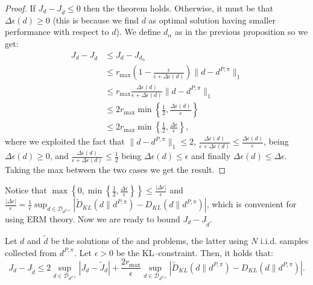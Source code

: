 \begin{proof}
	If $J_d - J_{\overline{d}} \le 0$ then the theorem holds. Otherwise, it must be that $\Delta \epsilon(d) \ge 0$ (this is because we find $\overline{d}$ as optimal solution having smaller performance with respect to $d$). We define $d_{\alpha}$ as in the previous proposition so we get:
	\begin{align*}
		J_{d} - J_{\overline{d}} & \le J_{d} - J_{d_{\alpha}}  \\
			& \le r_{\max}  \left(1 - \frac{\epsilon}{\epsilon + \Delta \epsilon(d)} \right) \|d - d^{P,\pi} \|_1  \\
			& \le r_{\max} \frac{\Delta \epsilon(d)}{\epsilon + \Delta \epsilon(d)}  \|d -  d^{P,\pi}\|_1  \\
			& \le 2 r_{\max} \min \left\{ \frac{1}{2}, \frac{\Delta \epsilon(d)}{\epsilon} \right\}  \\
			& \le 2 r_{\max}  \min \left\{ \frac{1}{2}, \frac{\Delta \epsilon}{\epsilon} \right\},
	\end{align*}
	where we exploited the fact that $\|d - d^{P,\pi} \|_1 \le 2$,  $\frac{\Delta \epsilon(d)}{\epsilon + \Delta \epsilon(d)} \le  \frac{\Delta \epsilon(d)}{\epsilon}$, being $\Delta \epsilon(d) \ge 0$, and $\frac{\Delta \epsilon(d)}{\epsilon + \Delta \epsilon(d)} \le  \frac{1}{2}$ being $\Delta\epsilon(d) \leq \epsilon$ and finally $\Delta \epsilon(d) \le \Delta \epsilon$. Taking the max between the two cases we get the result.
\end{proof}

Notice that $\max \left\{0, \min\left\{\frac{1}{2}, \frac{\Delta \epsilon}{\epsilon} \right\} \right\} \le \frac{|\Delta \epsilon|}{\epsilon}$ and  \newline $\frac{|\Delta \epsilon|}{\epsilon} = \frac{1}{\epsilon} \sup_{d \in \mathcal{D}_{d^{P,\pi}}} \left| {\widetilde{D}}_{KL}(d \|d^{P,\pi})- D_{KL}(d \|d^{P,\pi})\right|$, which is convenient for using ERM theory. Now we are ready to bound $J_d - J_{\widetilde{d}}$.

\begin{lemma}
\label{lemma:first}
	Let $d$ and $\widetilde{d}$ be the solutions of the \opt{\epsilon} and \opthat{\epsilon} problems, the latter using $N$ i.i.d. samples collected from $d^{P,\pi}$. Let $\epsilon > 0$ be the KL--constraint. Then, it holds that:
	\begin{equation}
		J_d - J_{\widetilde{d}} \le 2 \sup_{d \in \mathcal{D}_{d^{P,\pi}}} | J_d - \widetilde{J}_d | + \frac{2 r_{\max}}{\epsilon} \sup_{d \in \mathcal{D}_{d^{P,\pi}}} \left| {\widetilde{D}}_{KL}(d \|d^{P,\pi})- D_{KL}(d \|d^{P,\pi})\right|.
	\end{equation}
\end{lemma}

